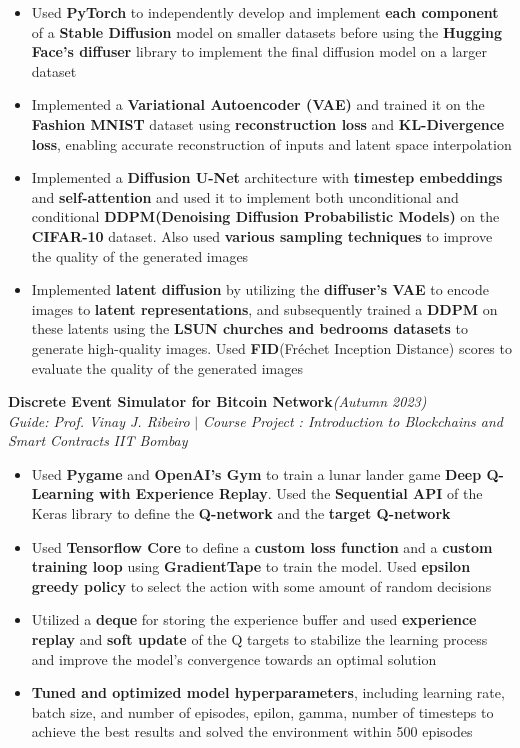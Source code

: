 \documentclass[a4paper,10pt]{article}
\begin{document}
\begin{itemize}[itemsep = -0.65 mm, leftmargin=*]
    \item Used \textbf{PyTorch} to independently develop and implement \textbf{each component} of a \textbf{Stable Diffusion} model on smaller datasets before using the \textbf{Hugging Face's diffuser} library to implement the final diffusion model on a larger dataset
    \item Implemented a \textbf{Variational Autoencoder (VAE)} and trained it on the \textbf{Fashion MNIST} dataset using \textbf{reconstruction loss} and \textbf{KL-Divergence loss}, enabling accurate reconstruction of inputs and latent space interpolation
    \item Implemented a \textbf{Diffusion U-Net} architecture with \textbf{timestep embeddings} and \textbf{self-attention} and used it to implement both unconditional and conditional \textbf{DDPM(Denoising Diffusion Probabilistic Models)} on the \textbf{CIFAR-10} dataset. Also used \textbf{various sampling techniques} to improve the quality of the generated images
    \item Implemented \textbf{latent diffusion} by utilizing the \textbf{diffuser's VAE} to encode images to \textbf{latent representations}, and subsequently trained a \textbf{DDPM} on these latents using the \textbf{LSUN churches and bedrooms datasets}  to generate high-quality images. Used \textbf{FID}(Fréchet Inception Distance) scores to evaluate the quality of the generated images
\end{itemize}
\vspace{\baselineskip}
\vspace{-15pt}
\noindent\textbf{\large Discrete Event Simulator for Bitcoin Network}\hfill{\sl \small (Autumn 2023)}\\
{\it Guide: Prof. Vinay J. Ribeiro} $|$ {\it Course Project : Introduction to Blockchains and Smart Contracts } \hfill{\it IIT Bombay}\\
\vspace{-15pt}
\begin{itemize}[itemsep = -0.65 mm, leftmargin=*]
    \item Used \textbf{Pygame} and \textbf{OpenAI's Gym} to train a lunar lander game \textbf{Deep Q-Learning with Experience Replay}. Used the \textbf{Sequential API} of the Keras library to define the \textbf{Q-network} and the \textbf{target Q-network}
    \item Used \textbf{Tensorflow Core} to define a \textbf{custom loss function} and a \textbf{custom training loop} using \textbf{GradientTape} to train the model. Used \textbf{epsilon greedy policy} to select the action with some amount of random decisions
    \item Utilized a \textbf{deque} for storing the experience buffer and used \textbf{experience replay} and \textbf{soft update} of the Q targets to stabilize the learning process and improve the model's convergence towards an optimal solution
    \item \textbf{Tuned and optimized model hyperparameters}, including learning rate, batch size, and number of episodes, epilon, gamma, number of timesteps to achieve the best results and solved the environment within 500 episodes
\end{itemize}
\end{document}
